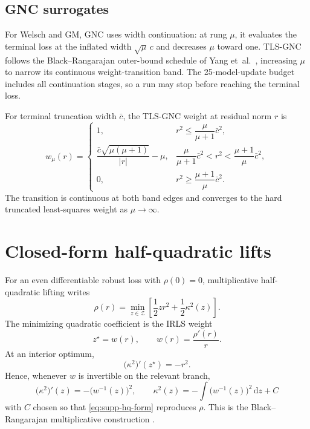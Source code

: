 \documentclass[runningheads]{llncs}
\begin{document}
\subsection{GNC surrogates}
\label{sec:supp-gnc}

For Welsch and GM, GNC uses width continuation: at rung $\mu$, it evaluates
the terminal loss at the inflated width $\sqrt{\mu}\,c$ and decreases $\mu$
toward one. TLS-GNC follows the Black--Rangarajan outer-bound schedule of
Yang et~al.~\cite{YangCarlone2020}, increasing $\mu$ to narrow its continuous
weight-transition band. The 25-model-update budget includes all continuation
stages, so a run may stop before reaching the terminal loss.

For terminal truncation width $\bar c$, the TLS-GNC weight at residual norm
$r$ is
\begin{equation}
w_\mu(r)=
\begin{cases}
1, & r^2\le\dfrac{\mu}{\mu+1}\bar c^2,\\[3pt]
\dfrac{\bar c\sqrt{\mu(\mu+1)}}{|r|}-\mu,
& \dfrac{\mu}{\mu+1}\bar c^2<r^2<\dfrac{\mu+1}{\mu}\bar c^2,\\[6pt]
0, & r^2\ge\dfrac{\mu+1}{\mu}\bar c^2.
\end{cases}
\label{eq:supp-gnc-tls}
\end{equation}
The transition is continuous at both band edges and converges to the hard
truncated least-squares weight as $\mu\to\infty$.

\section{Closed-form half-quadratic lifts}
\label{sec:supp-hq-derivations}

For an even differentiable robust loss with $\rho(0)=0$, multiplicative
half-quadratic lifting writes
\begin{equation}
	\rho(r)
	=
	\min_{z\in\mathcal Z}
	\left[
		\frac12 z r^2+\frac12\kappa^2(z)
		\right].
	\label{eq:supp-hq-form}
\end{equation}
The minimizing quadratic coefficient is the IRLS weight
\begin{equation}
	z^\star=w(r),\qquad
	w(r)=\frac{\rho'(r)}{r}.
	\label{eq:supp-hq-weight}
\end{equation}
At an interior optimum,
\begin{equation}
	\bigl(\kappa^2\bigr)'(z^\star)=-r^2.
\end{equation}
Hence, whenever $w$ is invertible on the relevant branch,
\begin{equation}
	\boxed{
		\bigl(\kappa^2\bigr)'(z)
		=-\bigl(w^{-1}(z)\bigr)^2,
		\qquad
		\kappa^2(z)
		=-\int\bigl(w^{-1}(z)\bigr)^2\,\mathrm dz+C
	}
	\label{eq:supp-hq-master}
\end{equation}
with $C$ chosen so that \cref{eq:supp-hq-form} reproduces $\rho$.
This is the Black--Rangarajan multiplicative construction
\cite{BlackRangarajan1996,Zach2014,ZachBourmaud2018}.
\end{document}
